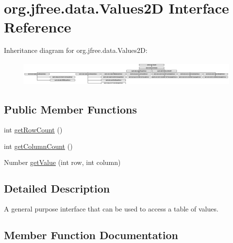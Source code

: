 \hypertarget{interfaceorg_1_1jfree_1_1data_1_1_values2_d}{}\section{org.\+jfree.\+data.\+Values2D Interface Reference}
\label{interfaceorg_1_1jfree_1_1data_1_1_values2_d}
Inheritance diagram for org.\+jfree.\+data.\+Values2D\+:\begin{figure}[H]
\begin{center}
\leavevmode
\includegraphics[height=1.306667cm]{interfaceorg_1_1jfree_1_1data_1_1_values2_d}
\end{center}
\end{figure}
\subsection*{Public Member Functions}
\begin{DoxyCompactItemize}
\item 
int \mbox{\hyperlink{interfaceorg_1_1jfree_1_1data_1_1_values2_d_a9ce939b45128515a9841a7d018a6ad0e}{get\+Row\+Count}} ()
\item 
int \mbox{\hyperlink{interfaceorg_1_1jfree_1_1data_1_1_values2_d_a212e32802dc2f32e0fb641740137c685}{get\+Column\+Count}} ()
\item 
Number \mbox{\hyperlink{interfaceorg_1_1jfree_1_1data_1_1_values2_d_a0797937d3ac62e18b300eef1fe906ec6}{get\+Value}} (int row, int column)
\end{DoxyCompactItemize}


\subsection{Detailed Description}
A general purpose interface that can be used to access a table of values. 

\subsection{Member Function Documentation}
\mbox{\label{interfaceorg_1_1jfree_1_1data_1_1_values2_d_a212e32802dc2f32e0fb641740137c685}} 
